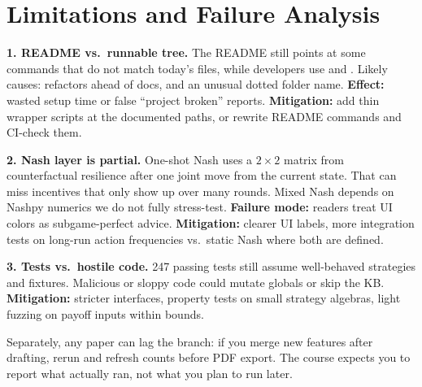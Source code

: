 \section{Limitations and Failure Analysis}

\textbf{1. README vs.\ runnable tree.} The README still points at some  commands that do not match today's files, while developers use  and . Likely causes: refactors ahead of docs, and an unusual dotted folder name. \textbf{Effect:} wasted setup time or false ``project broken'' reports. \textbf{Mitigation:} add thin wrapper scripts at the documented paths, or rewrite README commands and CI-check them.

\textbf{2. Nash layer is partial.} One-shot Nash uses a $2\times 2$ matrix from counterfactual resilience after one joint move from the current state. That can miss incentives that only show up over many rounds. Mixed Nash depends on Nashpy numerics we do not fully stress-test. \textbf{Failure mode:} readers treat UI colors as subgame-perfect advice. \textbf{Mitigation:} clearer UI labels, more integration tests on long-run action frequencies vs.\ static Nash where both are defined.

\textbf{3. Tests vs.\ hostile code.} 247 passing tests still assume well-behaved strategies and fixtures. Malicious or sloppy code could mutate globals or skip the KB. \textbf{Mitigation:} stricter interfaces, property tests on small strategy algebras, light fuzzing on payoff inputs within bounds.

Separately, any paper can lag the branch: if you merge new features after drafting, rerun  and refresh counts before PDF export. The course expects you to report what actually ran, not what you plan to run later.
